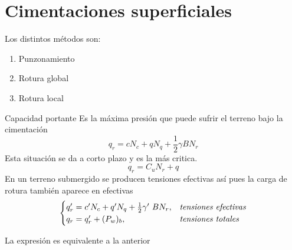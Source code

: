 \section{Cimentaciones superficiales} %
\label{sec:cimentaciones_superficiales}

\begin{mydef}
	Los distintos métodos son:
	\begin{enumerate}
		\item Punzonamiento
		\item Rotura global
		\item Rotura local
	\end{enumerate}
\end{mydef}

\begin{mybox}{Capacidad portante}
Es la máxima presión que puede sufrir el terreno bajo la cimentación
	\begin{equation}
		q_r = cN_c + qN_q + \frac{1}{2}\gamma B N_r
		\label{eq:capacidad_portante}
	\end{equation}
	Esta situación se da a corto plazo y es la más critica.
	\begin{equation}
		q_r = C_uN_r + q
	\end{equation}
	En un terreno submergido se producen tensiones efectivas así pues la carga de rotura también aparece en efectivas
	\begin{equation}
		\begin{cases}
			q_r^\prime = c^\prime N_c + q^\prime N_q + \frac{1}{2}\gamma^\prime B N_r, &\emph{tensiones efectivas}\\
			q_r = q_r^\prime + (P_w)_b, &\emph{tensiones totales}
		\end{cases}
	\end{equation}
	\begin{myrem}[Equivalencia]
		La expresión es equivalente a la anterior
	\end{myrem}
\end{mybox}

